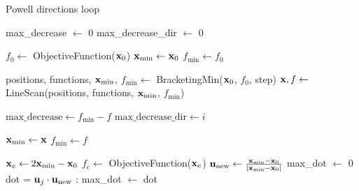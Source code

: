 \begin{algorithm}
    \caption{Powell directions loop}\label{alg:powell}
    \begin{algorithmic}[1]
        \State max\_decrease $\gets$ 0
        \State max\_decrease\_dir $\gets$ 0

        \State $f_0\gets$ ObjectiveFunction($\vb{x}_0$)
        \State $\vb{x}_{\text{min}}\gets \vb{x}_0$
        \State $f_{\text{min}}\gets f_0$

            \State positions, functions, $\vb{x}_{\text{min}}$, $f_{\text{min}}\gets  $ BracketingMin($\vb{x}_0$, $f_0$, step)
            \State $\vb{x}, f \gets$ LineScan(positions, functions, $\vb{x}_{\text{min}}$, $f_{\text{min}}$)

                \State $ \text{max\_decrease}\gets f_{\text{min}} - f$
                \State $ \text{max\_decrease\_dir}\gets i$
            \EndIf

            \State $\vb{x}_{\text{min}}\gets \vb{x}$
            \State $f_{\text{min}}\gets f$

            \State $\vb{x}_e\gets 2 \vb{x}_{\text{min}} - \vb{x}_0$
            \State $f_e \gets$ ObjectiveFunction($\vb{x}_e$)
            \State $\vb{u}_{\text{new}} \gets \frac{\vb{x}_{\text{min}}-\vb{x}_0}{|\vb{x}_{\text{min}}-\vb{x}_0|}$
            \State max\_dot $\gets$ 0
            \State dot = $\vb{u}_j\cdot \vb{u}_{\text{new}}$
            :
                \State max\_dot $\gets$ dot
            \EndIf
            \EndFor


\end{algorithmic}
\end{algorithm}
